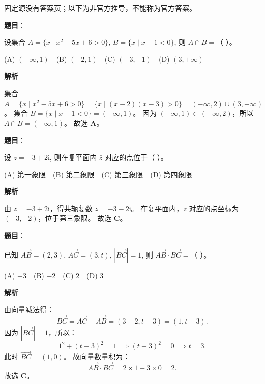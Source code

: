
\begin{gktip}
固定源没有答案页；以下为非官方推导，不能称为官方答案。
\end{gktip}


\begin{answer}

\textbf{题目}：

设集合 $A = \{x \mid x^2 - 5x + 6 > 0\}$, $B = \{x \mid x - 1 < 0\}$, 则 $A \cap B =$（ ）。

(A) $(-\infty, 1)$　(B) $(-2, 1)$　(C) $(-3, -1)$　(D) $(3, +\infty)$

\textbf{解析}

集合 $A = \{x \mid x^2 - 5x + 6 > 0\} = \{x \mid (x-2)(x-3) > 0\} = (-\infty, 2) \cup (3, +\infty)$。
集合 $B = \{x \mid x - 1 < 0\} = (-\infty, 1)$。
因为 $(-\infty, 1) \subset (-\infty, 2)$，所以 $A \cap B = (-\infty, 1)$。
故选 \textbf{A}。


\end{answer}
\begin{answer}

\textbf{题目}：

设 $z = -3 + 2\mathrm{i}$, 则在复平面内 $\bar{z}$ 对应的点位于（ ）。

(A) 第一象限　(B) 第二象限　(C) 第三象限　(D) 第四象限

\textbf{解析}

由 $z = -3 + 2\mathrm{i}$，得共轭复数 $\bar{z} = -3 - 2\mathrm{i}$。
在复平面内，$\bar{z}$ 对应的点坐标为 $(-3, -2)$，位于第三象限。
故选 \textbf{C}。


\end{answer}
\begin{answer}

\textbf{题目}：

已知 $\vec{AB} = (2, 3)$, $\vec{AC} = (3, t)$, $|\vec{BC}| = 1$, 则 $\vec{AB} \cdot \vec{BC} =$（ ）。

(A) $-3$　(B) $-2$　(C) $2$　(D) $3$

\textbf{解析}

由向量减法得：
\nopagebreak[4]
\[\vec{BC} = \vec{AC} - \vec{AB} = (3 - 2, t - 3) = (1, t - 3).\]
因为 $|\vec{BC}| = 1$，所以：
\nopagebreak[4]
\[1^2 + (t - 3)^2 = 1 \implies (t - 3)^2 = 0 \implies t = 3.\]
此时 $\vec{BC} = (1, 0)$。
故向量数量积为：
\nopagebreak[4]
\[\vec{AB} \cdot \vec{BC} = 2 \times 1 + 3 \times 0 = 2.\]
故选 \textbf{C}。


\end{answer}
